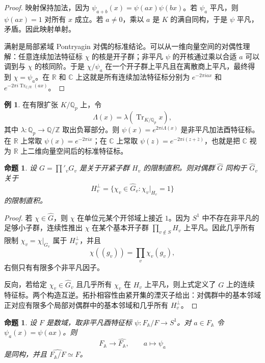 \documentclass[11pt,a4paper,openany]{ctexbook}
\numberwithin{equation}{chapter}
\newcommand{\Q}{\mathbb{Q}}
\newcommand{\R}{\mathbb{R}}
\newcommand{\C}{\mathbb{C}}
\newcommand{\Z}{\mathbb{Z}}
\newcommand{\A}{\mathbb{A}}
\theoremstyle{plain}
\newtheorem{proposition}[theorem]{命题}
\theoremstyle{definition}
\newtheorem{example}[theorem]{例}
\theoremstyle{remark}
\begin{document}
\begin{proof}
映射保持加法，因为 $\psi_{a+b}(x)=\psi(ax)\psi(bx)$。若 $\psi_a$ 平凡，则 $\psi(ax)=1$ 对所有 $x$ 成立。若 $a\ne0$，乘以 $a$ 是 $K$ 的满自同构，于是 $\psi$ 平凡，矛盾。因此映射单射。

满射是局部紧域 Pontryagin 对偶的标准结论。可以从一维向量空间的对偶性理解：任意连续加法特征标 $\chi$ 的核是开子群；非平凡 $\psi$ 的开核通过乘以合适 $a$ 可以调到与 $\chi$ 的核同阶。于是 $\chi/\psi_a$ 在一个开子群上平凡且在离散商上平凡，最终得到 $\chi=\psi_a$。在 $\R$ 和 $\C$ 上这就是所有连续加法特征标分别为 $e^{-2\pi iax}$ 和 $e^{-2\pi i\operatorname{Tr}_{\C/\R}(ax)}$。
\end{proof}

\begin{example}
在有限扩张 $K/\Q_p$ 上，令
\[
  \Lambda(x)=\lambda(\operatorname{Tr}_{K/\Q_p}x),
\]
其中 $\lambda:\Q_p\to\Q/\Z$ 取出负幂部分。则 $\psi(x)=e^{2\pi i\Lambda(x)}$ 是非平凡加法酉特征标。在 $\R$ 上常取 $\psi(x)=e^{-2\pi ix}$；在 $\C$ 上常取 $\psi(z)=e^{-2\pi i(z+\bar z)}$，也就是把 $\C$ 视为 $\R$ 上二维向量空间后的标准特征标。
\end{example}

\begin{proposition}
设 $G=\prod'_vG_v$ 是关于开紧子群 $H_v$ 的限制直积。则对偶群 $\widehat G$ 同构于 $\widehat G_v$ 关于
\[
  H_v^\perp=\{\chi_v\in\widehat G_v:\chi_v|_{H_v}=1\}
\]
的限制直积。
\end{proposition}

\begin{proof}
若 $\chi\in\widehat G$，则 $\chi$ 在单位元某个开邻域上接近 $1$。因为 $S^1$ 中不存在非平凡的足够小子群，连续性推出 $\chi$ 在某个基本开子群 $\prod_{v\notin S}H_v$ 上平凡。因此几乎所有限制 $\chi_v=\chi|_{G_v}$ 属于 $H_v^\perp$，并且
\[
  \chi((g_v))=\prod_v\chi_v(g_v),
\]
右侧只有有限多个非平凡因子。

反向，若给定 $\chi_v\in\widehat G_v$ 且几乎所有 $\chi_v$ 在 $H_v$ 上平凡，则上式定义了 $G$ 上的连续特征标。两个构造互逆。拓扑相容性由紧开集的湮灭子给出：对偶群中的基本邻域正对应有限多个局部对偶群中的基本邻域和几乎所有 $H_v^\perp$。
\end{proof}

\begin{proposition}
设 $F$ 是数域，取非平凡酉特征标 $\psi:F_{\A}/F\to S^1$。对 $a\in F_{\A}$ 令 $\psi_a(x)=\psi(ax)$。则
\[
  F_{\A}\longrightarrow \widehat{F_{\A}},\qquad a\longmapsto \psi_a
\]
是同构，并且 $\widehat{F_{\A}/F}\simeq F$。
\end{proposition}
\end{document}
